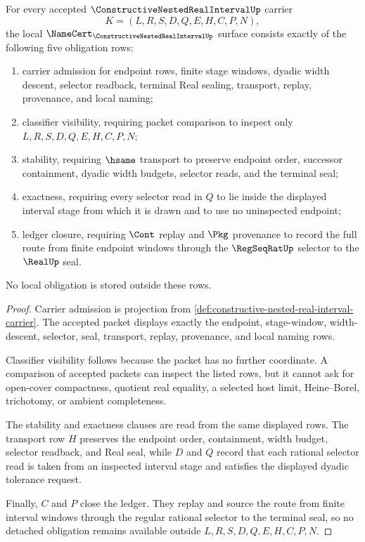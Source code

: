\begin{theorem}\label{thm:constructive-nested-real-interval-namecert-obligations}
For every accepted $\ConstructiveNestedRealIntervalUp$ carrier
$$
K=(L,R,S,D,Q,E,H,C,P,N),
$$
the local $\NameCert_{\ConstructiveNestedRealIntervalUp}$ surface consists exactly of the following five obligation rows:
\begin{enumerate}
\item carrier admission for endpoint rows, finite stage windows, dyadic width descent, selector readback, terminal Real sealing, transport, replay, provenance, and local naming;
\item classifier visibility, requiring packet comparison to inspect only $L,R,S,D,Q,E,H,C,P,N$;
\item stability, requiring $\hsame$ transport to preserve endpoint order, successor containment, dyadic width budgets, selector reads, and the terminal seal;
\item exactness, requiring every selector read in $Q$ to lie inside the displayed interval stage from which it is drawn and to use no uninspected endpoint;
\item ledger closure, requiring $\Cont$ replay and $\Pkg$ provenance to record the full route from finite endpoint windows through the $\RegSeqRatUp$ selector to the $\RealUp$ seal.
\end{enumerate}
No local obligation is stored outside these rows.
\end{theorem}
\begin{proof}
Carrier admission is projection from \autoref{def:constructive-nested-real-interval-carrier}. The accepted packet displays exactly the endpoint, stage-window, width-descent, selector, seal, transport, replay, provenance, and local naming rows.

Classifier visibility follows because the packet has no further coordinate. A comparison of accepted packets can inspect the listed rows, but it cannot ask for open-cover compactness, quotient real equality, a selected host limit, Heine--Borel, trichotomy, or ambient completeness.

The stability and exactness clauses are read from the same displayed rows. The transport row $H$ preserves the endpoint order, containment, width budget, selector readback, and Real seal, while $D$ and $Q$ record that each rational selector read is taken from an inspected interval stage and satisfies the displayed dyadic tolerance request.

Finally, $C$ and $P$ close the ledger. They replay and source the route from finite interval windows through the regular rational selector to the terminal seal, so no detached obligation remains available outside $L,R,S,D,Q,E,H,C,P,N$.
\end{proof}

